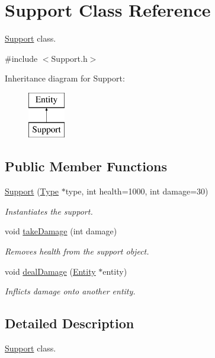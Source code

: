 \hypertarget{classSupport}{}\section{Support Class Reference}
\label{classSupport}


\hyperlink{classSupport}{Support} class.  




{\ttfamily \#include $<$Support.\+h$>$}

Inheritance diagram for Support\+:\begin{figure}[H]
\begin{center}
\leavevmode
\includegraphics[height=2.000000cm]{classSupport}
\end{center}
\end{figure}
\subsection*{Public Member Functions}
\begin{DoxyCompactItemize}
\item 
\hyperlink{classSupport_a8b4c631dcfd81be50ee86f3ed01d5c1e}{Support} (\hyperlink{classType}{Type} $\ast$type, int health=1000, int damage=30)
\begin{DoxyCompactList}\small\item\em Instantiates the support. \end{DoxyCompactList}\item 
void \hyperlink{classSupport_afb159bd8c474ec67ad5d03fa24c38564}{take\+Damage} (int damage)
\begin{DoxyCompactList}\small\item\em Removes health from the support object. \end{DoxyCompactList}\item 
void \hyperlink{classSupport_a5f2cb243e746adea36b3c78548029ce3}{deal\+Damage} (\hyperlink{classEntity}{Entity} $\ast$entity)
\begin{DoxyCompactList}\small\item\em Inflicts damage onto another entity. \end{DoxyCompactList}\end{DoxyCompactItemize}


\subsection{Detailed Description}
\hyperlink{classSupport}{Support} class. 

